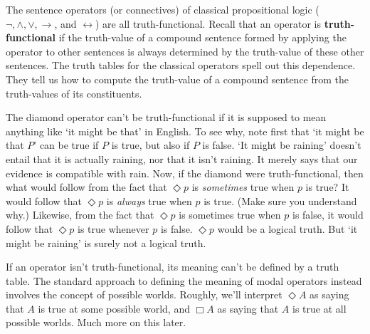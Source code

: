 The sentence operators (or connectives) of classical propositional logic
($\neg, \land, \lor, \to$, and $\leftrightarrow$) are all truth-functional. Recall
that an operator is \textbf{truth-functional} if the truth-value of a compound
sentence formed by applying the operator to other sentences is always determined
by the truth-value of these other sentences. The truth tables for the classical
operators spell out this dependence. They tell us how to compute the truth-value
of a compound sentence from the truth-values of its constituents.


The diamond operator can't be truth-functional if it is supposed to mean
anything like `it might be that' in English. To see why, note first that `it
might be that $P$' can be true if $P$ is true, but also if $P$ is false. `It
might be raining' doesn't entail that it is actually raining, nor that it isn't
raining. It merely says that our evidence is compatible with rain. Now, if the
diamond were truth-functional, then what would follow from the fact that
$\Diamond p$ is \emph{sometimes} true when $p$ is true? It would follow that
$\Diamond p$ is \emph{always} true when $p$ is true. (Make sure you understand
why.) Likewise, from the fact that $\Diamond p$ is sometimes true when $p$ is
false, it would follow that $\Diamond p$ is true whenever $p$ is false.
$\Diamond p$ would be a logical truth. But `it might be raining' is surely not a
logical truth.



If an operator isn't truth-functional, its meaning can't be defined by a truth
table. The standard approach to defining the meaning of modal operators instead
involves the concept of possible worlds. Roughly, we'll interpret $\Diamond A$
as saying that $A$ is true at some possible world, and $\Box A$ as saying that
$A$ is true at all possible worlds. Much more on this later.

